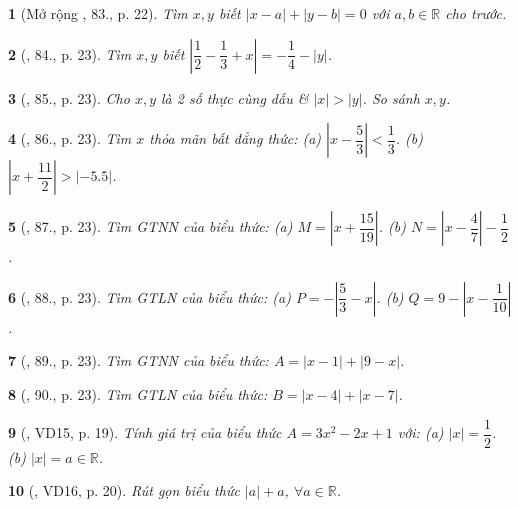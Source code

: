 \documentclass{article}
\newtheorem{baitoan}{}
\begin{document}
\begin{baitoan}[Mở rộng \cite{Tuyen_Toan_7}, 83., p. 22]
	Tìm $x,y$ biết $|x - a| + |y - b| = 0$ với $a,b\in\mathbb{R}$ cho trước.
\end{baitoan}

\begin{baitoan}[\cite{Tuyen_Toan_7}, 84., p. 23]
	Tìm $x,y$ biết $\left|\dfrac{1}{2} - \dfrac{1}{3} + x\right| = -\dfrac{1}{4} - |y|$.
\end{baitoan}

\begin{baitoan}[\cite{Tuyen_Toan_7}, 85., p. 23]
	Cho $x,y$ là 2 số thực cùng dấu \& $|x| > |y|$. So sánh $x,y$.
\end{baitoan}

\begin{baitoan}[\cite{Tuyen_Toan_7}, 86., p. 23]
	Tìm $x$ thỏa mãn bất đẳng thức: (a) $\left|x - \dfrac{5}{3}\right| < \dfrac{1}{3}$. (b) $\left|x + \dfrac{11}{2}\right| > |-5.5|$.
\end{baitoan}

\begin{baitoan}[\cite{Tuyen_Toan_7}, 87., p. 23]
	Tìm {\rm GTNN} của biểu thức: (a) $M = \left|x + \dfrac{15}{19}\right|$. (b) $N = \left|x - \dfrac{4}{7}\right| - \dfrac{1}{2}$.
\end{baitoan}

\begin{baitoan}[\cite{Tuyen_Toan_7}, 88., p. 23]
	Tìm {\rm GTLN} của biểu thức: (a) $P = -\left|\dfrac{5}{3} - x\right|$. (b) $Q = 9 - \left|x - \dfrac{1}{10}\right|$.
\end{baitoan}

\begin{baitoan}[\cite{Tuyen_Toan_7}, 89., p. 23]
	Tìm {\rm GTNN} của biểu thức: $A = |x - 1| + |9 - x|$.
\end{baitoan}

\begin{baitoan}[\cite{Tuyen_Toan_7}, 90., p. 23]
	Tìm {\rm GTLN} của biểu thức: $B = |x - 4| + |x - 7|$.
\end{baitoan}

\begin{baitoan}[\cite{Binh_Toan_7_tap_1}, VD15, p. 19]
	Tính giá trị của biểu thức $A = 3x^2 - 2x + 1$ với: (a) $|x| = \dfrac{1}{2}$. (b) $|x| = a\in\mathbb{R}$.
\end{baitoan}

\begin{baitoan}[\cite{Binh_Toan_7_tap_1}, VD16, p. 20]
	Rút gọn biểu thức $|a| + a$, $\forall a\in\mathbb{R}$.
\end{baitoan}
\end{document}
